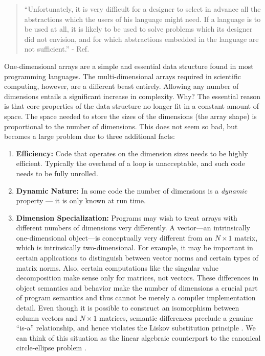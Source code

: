 \documentclass[preprint]{sigplanconf}
\begin{document}
\begin{quotation}
``Unfortunately, it is very difficult for a designer to select in advance all
the abstractions which the users of his language might need. If a language is
to be used at all, it is likely to be used to solve problems which its
designer did not envision, and for which abstractions embedded in the language
are not sufficient.'' - Ref. \cite{Liskov:1974pb}
\end{quotation}

One-dimensional arrays are a simple and essential data structure found in most
programming languages. The multi-dimensional arrays required in scientific
computing, however, are a different beast entirely. Allowing any number of
dimensions entails a significant increase in complexity. Why? The essential
reason is that core properties of the data structure no longer fit in a
constant amount of space. The space needed to store the sizes of the
dimensions (the array shape) is proportional to the number of dimensions. This
does not seem so bad, but becomes a large problem due to three additional
facts:

\begin{enumerate}

\item{\bf Efficiency:} Code that operates on the dimension sizes needs to be
highly efficient. Typically the overhead of a loop is unacceptable, and such
code needs to be fully unrolled.

\item{\bf Dynamic Nature:} In some code the number of dimensions is a
\emph{dynamic} property --- it is only known at run time.


\item {\bf Dimension Specialization:} Programs may wish to treat arrays with
different numbers of dimensions very differently. A vector---an intrinsically
one-dimensional object---is conceptually very different from an $N\times1$
matrix, which is intrinsically two-dimensional. For example, it may be important
in certain applications to distinguish between vector norms and certain types
of matrix norms. Also, certain computations like the singular value decomposition
make sense only for matrices, not vectors. These differences in object semantics
and behavior make the number of dimensions a crucial part of program semantics and
thus cannot be merely a compiler implementation detail. Even though it is possible
to construct an isomorphism between column vectors and $N\times1$ matrices,
semantic differences preclude a genuine ``is-a'' relationship, and hence violates
the Liskov substitution principle \cite{Liskov:1987da}. We can think of this
situation as the linear algebraic counterpart to the canonical circle-ellipse
problem \cite{Halbert:1987ut}.


\end{enumerate}
\end{document}
